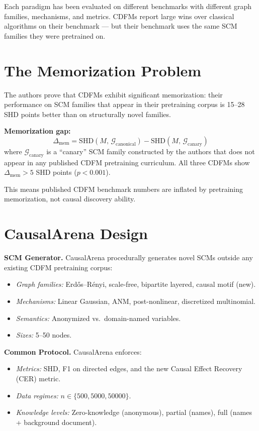 \documentclass[10pt,twocolumn]{article}
\begin{document}
Each paradigm has been evaluated on different benchmarks with different
graph families, mechanisms, and metrics. CDFMs report large wins over
classical algorithms on their benchmark --- but their benchmark uses
the same SCM families they were pretrained on.

\section{The Memorization Problem}

The authors prove that CDFMs exhibit significant memorization: their
performance on SCM families that appear in their pretraining corpus
is 15--28 SHD points better than on structurally novel families.

\textbf{Memorization gap:}
\[
  \Delta_\mathrm{mem} = \mathrm{SHD}(M,\, \mathcal{G}_\mathrm{canonical})
    - \mathrm{SHD}(M,\, \mathcal{G}_\mathrm{canary})
\]
where $\mathcal{G}_\mathrm{canary}$ is a ``canary'' SCM family
constructed by the authors that does not appear in any published
CDFM pretraining curriculum. All three CDFMs show
$\Delta_\mathrm{mem} > 5$ SHD points ($p < 0.001$).

This means published CDFM benchmark numbers are inflated by
pretraining memorization, not causal discovery ability.

\section{CausalArena Design}

\textbf{SCM Generator.} CausalArena procedurally generates novel
SCMs outside any existing CDFM pretraining corpus:
\begin{itemize}[itemsep=2pt,topsep=2pt]
  \item \textit{Graph families:} Erd\H{o}s--R\'enyi, scale-free,
    bipartite layered, causal motif (new).
  \item \textit{Mechanisms:} Linear Gaussian, ANM, post-nonlinear,
    discretized multinomial.
  \item \textit{Semantics:} Anonymized vs.\ domain-named variables.
  \item \textit{Sizes:} 5--50 nodes.
\end{itemize}

\textbf{Common Protocol.} CausalArena enforces:
\begin{itemize}[itemsep=2pt,topsep=2pt]
  \item \textit{Metrics:} SHD, F1 on directed edges, and the new
    Causal Effect Recovery (CER) metric.
  \item \textit{Data regimes:} $n \in \{500, 5000, 50000\}$.
  \item \textit{Knowledge levels:} Zero-knowledge (anonymous),
    partial (names), full (names + background document).
\end{itemize}
\end{document}
